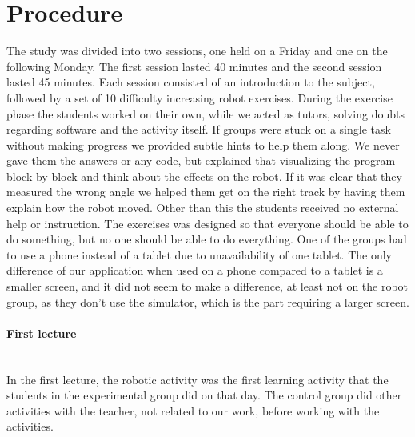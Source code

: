 \section{Procedure}
The study was divided into two sessions, one held on a Friday and one on the following Monday. The first session lasted 40 minutes and the second session lasted 45 minutes. 
Each session consisted of an introduction to the subject, followed by a set of 10 difficulty increasing robot exercises. 
During the exercise phase the students worked on their own, while we acted as tutors, solving doubts regarding software and the activity itself. If groups were stuck on a single task without making progress we provided subtle hints to help them along. 
We never gave them the answers or any code, but explained that visualizing the program block by block and think about the effects on the robot. If it was clear that they measured the wrong angle we helped them get on the right track by having them explain how the robot moved. 
Other than this the students received no external help or instruction. The exercises was designed so that everyone should be able to do something, but no one should be able to do everything. 
One of the groups had to use a phone instead of a tablet due to unavailability of one tablet. 
The only difference of our application when used on a phone compared to a tablet is a smaller screen, and it did not seem to make a difference, at least not on the robot group, as they don't use the simulator, which is the part requiring a larger screen. 

\paragraph{First lecture}~\\
In the first lecture, the robotic activity was the first learning activity that the students in the experimental group did on that day. 
The control group did other activities with the teacher, not related to our work, before working with the activities. 


